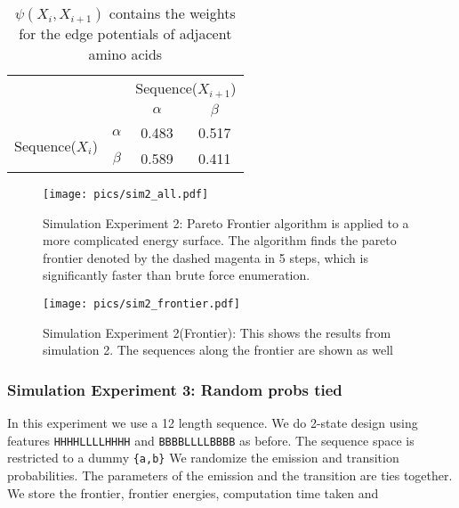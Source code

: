 \begin{table}
\begin{center}
\begin{tabular}{cc|c|c|}
\cline{3-4}
& & \multicolumn{2}{c|}{Sequence($X_{i+1}$)} \\ \cline{3-4}
& & $\alpha$ & $\beta$  \\ \cline{1-4}
\multicolumn{1}{|c|}{\multirow{2}{*}{Sequence($X_i$)}} &
\multicolumn{1}{|c|}{$\alpha$} & 0.483 & 0.517      \\ \cline{2-4}
\multicolumn{1}{|c|}{}                        &
\multicolumn{1}{|c|}{$\beta$} & 0.589 & 0.411      \\ \cline{1-4}
\end{tabular}
\end{center}
\caption{$\psi(X_i,X_{i+1})$ contains the weights for the edge potentials of adjacent amino acids}
\label{tab:psi4}
\end{table}


\begin{figure}[h!]
    \centering
    \texttt{[image: pics/sim2\_all.pdf]}
    \caption{Simulation Experiment 2: Pareto Frontier algorithm is applied to a more complicated energy surface. The algorithm finds the pareto frontier denoted by the dashed magenta in 5 steps, which is significantly faster than brute force enumeration.  }
    \label{fig:sim2_all}
\end{figure}

\begin{figure}[h!]
    \centering
    \texttt{[image: pics/sim2\_frontier.pdf]}
    \caption{Simulation Experiment 2(Frontier): This shows the results from simulation 2. The sequences along the frontier are shown as well }
    \label{fig:sim2_frontier}
\end{figure}

\pagebreak
\clearpage

\subsubsection{Simulation Experiment 3: Random probs tied}
\label{sim:randprobstied}
In this experiment we use a 12 length sequence. We do 2-state design using features \texttt{HHHHLLLLHHHH} and \texttt{BBBBLLLLBBBB} as before. The sequence space is restricted to a dummy \texttt{\{a,b\}}  We randomize the emission and transition probabilities. The parameters of the emission and the transition are ties together.  We store the frontier, frontier energies, computation time taken and 

